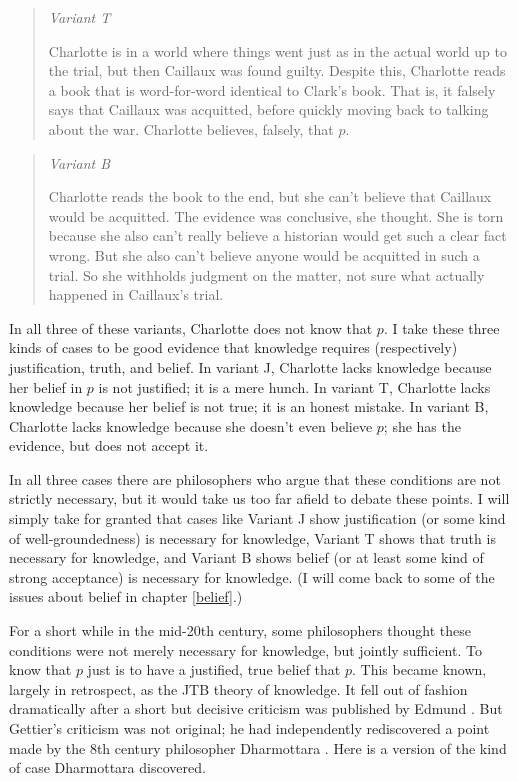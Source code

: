 \documentclass[11pt,]{book}
\begin{document}
\begin{quote}
\emph{Variant T}

Charlotte is in a world where things went just as in the actual world up to the trial, but then Caillaux was found guilty. Despite this, Charlotte reads a book that is word-for-word identical to Clark's book. That is, it falsely says that Caillaux was acquitted, before quickly moving back to talking about the war. Charlotte believes, falsely, that \(p\).
\end{quote}

\begin{quote}
\emph{Variant B}

Charlotte reads the book to the end, but she can't believe that Caillaux would be acquitted. The evidence was conclusive, she thought. She is torn because she also can't really believe a historian would get such a clear fact wrong. But she also can't believe anyone would be acquitted in such a trial. So she withholds judgment on the matter, not sure what actually happened in Caillaux's trial.
\end{quote}

In all three of these variants, Charlotte does not know that \(p\). I take these three kinds of cases to be good evidence that knowledge requires (respectively) justification, truth, and belief. In variant J, Charlotte lacks knowledge because her belief in \(p\) is not justified; it is a mere hunch. In variant T, Charlotte lacks knowledge because her belief is not true; it is an honest mistake. In variant B, Charlotte lacks knowledge because she doesn't even believe \(p\); she has the evidence, but does not accept it.

In all three cases there are philosophers who argue that these conditions are not strictly necessary, but it would take us too far afield to debate these points. I will simply take for granted that cases like Variant J show justification (or some kind of well-groundedness) is necessary for knowledge, Variant T shows that truth is necessary for knowledge, and Variant B shows belief (or at least some kind of strong acceptance) is necessary for knowledge. (I will come back to some of the issues about belief in chapter \ref{belief}.)

For a short while in the mid-20th century, some philosophers thought these conditions were not merely necessary for knowledge, but jointly sufficient. To know that \(p\) just is to have a justified, true belief that \(p\). This became known, largely in retrospect, as the JTB theory of knowledge. It fell out of fashion dramatically after a short but decisive criticism was published by Edmund \citet{Gettier1963}. But Gettier's criticism was not original; he had independently rediscovered a point made by the 8th century philosopher Dharmottara \citep{Nagel2014}. Here is a version of the kind of case Dharmottara discovered.
\end{document}
